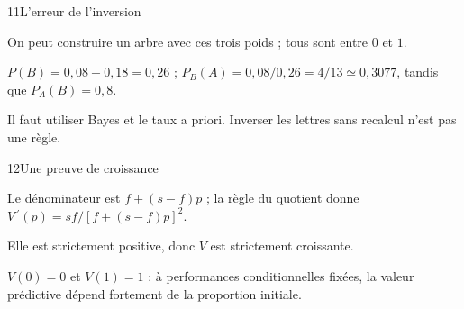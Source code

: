 \begin{corrige}{11}{L’erreur de l’inversion}
\begin{questions}
\item On peut construire un arbre avec ces trois poids ; tous sont entre $0$ et $1$.
\item $P(B)=0{,}08+0{,}18=0{,}26$ ; $P_B(A)=0{,}08/0{,}26=4/13\simeq0{,}3077$, tandis que $P_A(B)=0{,}8$.
\item Il faut utiliser Bayes et le taux a priori. Inverser les lettres sans recalcul n’est pas une règle.
\end{questions}
\end{corrige}
\begin{corrige}{12}{Une preuve de croissance}
\begin{questions}
\item Le dénominateur est $f+(s-f)p$ ; la règle du quotient donne $V\,\!^{\prime}(p)=sf/[f+(s-f)p]^2$.
\item Elle est strictement positive, donc $V$ est strictement croissante.
\item $V(0)=0$ et $V(1)=1$ : à performances conditionnelles fixées, la valeur prédictive dépend fortement de la proportion initiale.
\end{questions}
\end{corrige}
